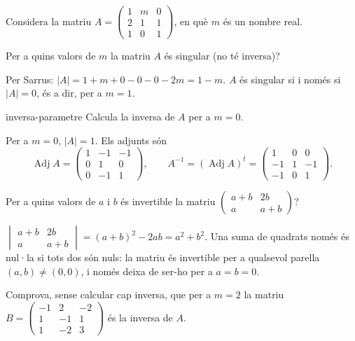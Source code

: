 Considera la matriu $A=\begin{pmatrix}1&m&0\\2&1&1\\1&0&1\end{pmatrix}$, en què $m$ és un nombre real.

\begin{apartats}

Per a quins valors de $m$ la matriu $A$ és singular (no té inversa)?

\begin{solucio}
Per Sarrus: $|A|=1+m+0-0-0-2m=1-m$. $A$ és singular si i només si $|A|=0$, és a dir, per a $m=1$.
\end{solucio}

\begin{tria}{inversa-parametre}
Calcula la inversa de $A$ per a $m=0$.

\begin{solucio}
Per a $m=0$, $|A|=1$. Els adjunts són
\[
\operatorname{Adj}A=\begin{pmatrix}1&-1&-1\\0&1&0\\0&-1&1\end{pmatrix},\qquad
A^{-1}=(\operatorname{Adj}A)^t=\begin{pmatrix}1&0&0\\-1&1&-1\\-1&0&1\end{pmatrix}.
\]
\end{solucio}

Per a quins valors de $a$ i $b$ és invertible la matriu $\begin{pmatrix}a+b&2b\\a&a+b\end{pmatrix}$?

\begin{solucio}
$\begin{vmatrix}a+b&2b\\a&a+b\end{vmatrix}=(a+b)^2-2ab=a^2+b^2$. Una suma de quadrats només és nul·la si
tots dos són nuls: la matriu és invertible per a qualsevol parella $(a,b)\ne(0,0)$, i només deixa de
ser-ho per a $a=b=0$.
\end{solucio}
\end{tria}

\begin{nomesllarg}
Comprova, sense calcular cap inversa, que per a $m=2$ la matriu
$B=\begin{pmatrix}-1&2&-2\\1&-1&1\\1&-2&3\end{pmatrix}$ és la inversa de $A$.


\end{nomesllarg}
\end{apartats}
